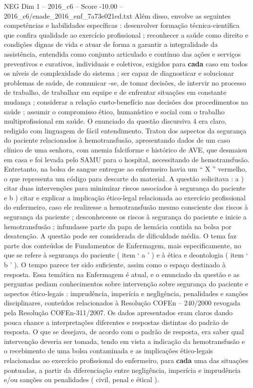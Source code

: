 \begin{textsample}{NEG Dim 1 – 2016\_c6 – Score -10.00 – 2016\_c6/enade\_2016\_enf\_7a73e021ed.txt}
Além disso, envolve as seguintes competências e habilidades específicas : desenvolver formação técnica-científica que confira qualidade ao exercício profissional ; reconhecer a saúde como direito e condições dignas de vida e atuar de forma a garantir a integralidade da assistência, entendida como conjunto articulado e contínuo das ações e serviços preventivos e curativos, individuais e coletivos, exigidos para \textbf{cada} caso em todos os níveis de complexidade do sistema ; ser capaz de diagnosticar e solucionar problemas de saúde, de comunicar -se, de tomar decisões, de intervir no processo de trabalho, de trabalhar em equipe e de enfrentar situações em constante mudança ; considerar a relação custo-benefício nas decisões dos procedimentos na saúde ; assumir o compromisso ético, humanístico e social com o trabalho multiprofissional em saúde.
O enunciado da questão discursiva 4 era claro, redigido com linguagem de fácil entendimento.
Tratou dos aspectos da segurança do paciente relacionados à hemotransfusão, apresentando dados de um caso clínico de uma senhora, com anemia falciforme e histórico de AVE, que desmaiou em casa e foi levada pelo SAMU para o hospital, necessitando de hemotransfusão.
Entretanto, na bolsa de sangue entregue ao enfermeiro havia um “ X ” vermelho, o que representa um código para descarte do material.
A questão solicitava : a ) citar duas intervenções para minimizar riscos associados à segurança do paciente e b ) citar e explicar a implicação ético-legal relacionada ao exercício profissional do enfermeiro, caso ele realizesse a hemotransfusão mesmo consciente dos riscos à segurança da paciente ; desconhecesse os riscos à segurança do paciente e inicie a hemotransfusão ; infundasse parte da papa de hemácia contida na bolsa por desatenção.
A questão pode ser considerada de dificuldade média.
O tema faz parte dos conteúdos de Fundamentos de Enfermagem, mais especificamente, no que se refere à segurança do paciente ( item ‘ a ’ ) e à ética e deontologia ( item ‘ b ’ ).
O tempo parece ter sido suficiente, assim como o espaço destinado à resposta.
Essa temática na Enfermagem é atual, e o enunciado da questão e as perguntas pediam conhecimentos sobre intervenção sobre segurança do paciente e aspectos ético-legais : imprudência, imperícia e negligência, penalidades e sanções disciplinares, conteúdos relacionados à Resolução COFEn – 240/2000 revogada pela Resolução COFEn-311/2007.
Os dados apresentados eram claros dando pouca chance a interpretações diferentes e respostas distintas do padrão de resposta.
O que se desejava, de acordo com o padrão de resposta, era saber qual intervenção deveria ser tomada, tendo em vista a indicação da hemotransfusão e o recebimento de uma bolsa contaminada e as implicações ético-legais relacionadas ao exercício profissional do enfermeiro, para \textbf{cada} uma das situações pontuadas, a partir da diferenciação entre negligência, imperícia e imprudência e/ou sanções ou penalidades ( civil, penal e étical ).

\end{textsample}
